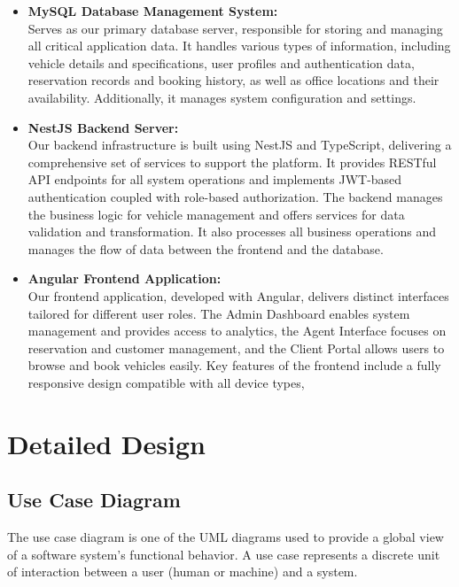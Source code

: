 \begin{itemize}
    \item \textbf{MySQL Database Management System:} \\
   Serves as our primary database server, responsible for storing and managing all critical application data. It handles various types of information, including vehicle details and specifications, user profiles and authentication data, reservation records and booking history, as well as office locations and their availability. Additionally, it manages system configuration and settings.
    
    \item \textbf{NestJS Backend Server:} \\
    Our backend infrastructure is built using NestJS and TypeScript, delivering a comprehensive set of services to support the platform. It provides RESTful API endpoints for all system operations and implements JWT-based authentication coupled with role-based authorization. The backend manages the business logic for vehicle management and offers services for data validation and transformation. It also  processes all business operations and manages the flow of data between the frontend and the database.
    
    \item \textbf{Angular Frontend Application:} \\
    Our frontend application, developed with Angular, delivers distinct interfaces tailored for different user roles. The Admin Dashboard enables system management and provides access to analytics, the Agent Interface focuses on reservation and customer management, and the Client Portal allows users to browse and book vehicles easily. Key features of the frontend include a fully responsive design compatible with all device types,

\end{itemize}

\section{Detailed Design}
\subsection{Use Case Diagram}
The use case diagram is one of the UML diagrams used to provide a global view of a software system's functional behavior. A use case represents a discrete unit of interaction between a user (human or machine) and a system.
\newpage
